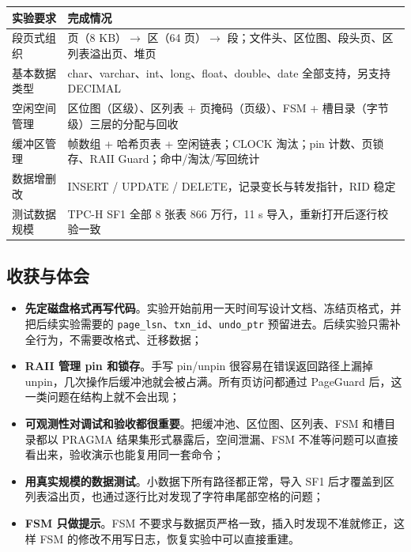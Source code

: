 \documentclass[11pt,a4paper]{ctexart}
\newcommand{\code}[1]{\texttt{#1}}
\begin{document}
\begin{table}[H]
  \centering
  \begin{tabularx}{\textwidth}{l X}
    \toprule
    实验要求 & 完成情况 \\
    \midrule
    段页式组织 & 页（8 KB）$\rightarrow$ 区（64 页）$\rightarrow$ 段；文件头、区位图、段头页、区列表溢出页、堆页 \\
    基本数据类型 & char、varchar、int、long、float、double、date 全部支持，另支持 DECIMAL \\
    空闲空间管理 & 区位图（区级）、区列表 + 页掩码（页级）、FSM + 槽目录（字节级）三层的分配与回收 \\
    缓冲区管理 & 帧数组 + 哈希页表 + 空闲链表；CLOCK 淘汰；pin 计数、页锁存、RAII Guard；命中/淘汰/写回统计 \\
    数据增删改 & INSERT / UPDATE / DELETE，记录变长与转发指针，RID 稳定 \\
    测试数据规模 & TPC-H SF1 全部 8 张表 866 万行，11 s 导入，重新打开后逐行校验一致 \\
    \bottomrule
  \end{tabularx}
\end{table}

\subsection{收获与体会}

\begin{itemize}
  \item \textbf{先定磁盘格式再写代码}。实验开始前用一天时间写设计文档、冻结页格式，并把后续实验需要的 \code{page\_lsn}、\code{txn\_id}、\code{undo\_ptr} 预留进去。后续实验只需补全行为，不需要改格式、迁移数据；
  \item \textbf{RAII 管理 pin 和锁存}。手写 pin/unpin 很容易在错误返回路径上漏掉 unpin，几次操作后缓冲池就会被占满。所有页访问都通过 PageGuard 后，这一类问题在结构上就不会出现；
  \item \textbf{可观测性对调试和验收都很重要}。把缓冲池、区位图、区列表、FSM 和槽目录都以 PRAGMA 结果集形式暴露后，空间泄漏、FSM 不准等问题可以直接看出来，验收演示也能复用同一套命令；
  \item \textbf{用真实规模的数据测试}。小数据下所有路径都正常，导入 SF1 后才覆盖到区列表溢出页，也通过逐行比对发现了字符串尾部空格的问题；
  \item \textbf{FSM 只做提示}。FSM 不要求与数据页严格一致，插入时发现不准就修正，这样 FSM 的修改不用写日志，恢复实验中可以直接重建。
\end{itemize}
\end{document}
